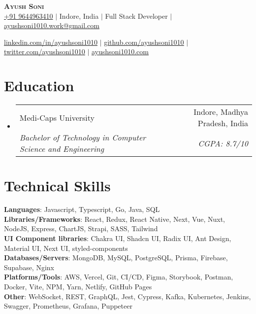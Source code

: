 \documentclass[letterpaper,11pt]{article}
\makeatletter
\newcommand{\resumeSubheading}[4]{
    \item
      \begin{tabular*}{0.97\textwidth}[t]{l@{\extracolsep{\fill}}r}
        {#1} & #2 \\
        \textit{\small#3} & \textit{\small #4} \\
      \end{tabular*}\vspace{-5pt}
  }
\newcommand{\resumeSubHeadingListStart}{\begin{itemize}[leftmargin=0.15in, label={}]}
\newcommand{\resumeSubHeadingListEnd}{\end{itemize}}
\makeatother
\begin{document}

\begin{center}
  \textbf{\Huge \scshape Ayush Soni} \\ \vspace{10pt}
  \href{tel:9644963410}{+91 9644963410} $|$
  {Indore, India} $|$
  {Full Stack Developer} $|$
  \href{mailto:ayushsoni1010.work@gmail.com}{ayushsoni1010.work@gmail.com} \\ \vspace{3pt}

  \href{https://linkedin.com/in/ayushsoni1010}{\underline{linkedin.com/in/ayushsoni1010}} $|$
  \href{https://github.com/ayushsoni1010}{\underline{github.com/ayushsoni1010}} $|$
  \href{https://twitter.com/ayushsoni1010}{\underline{twitter.com/ayushsoni1010}} $|$
  \href{https://ayushsoni1010.com}{\underline{ayushsoni1010.com}}
\end{center}



\section{Education}
\resumeSubHeadingListStart
\resumeSubheading
{Medi-Caps University}{Indore, Madhya Pradesh, India}
{Bachelor of Technology in Computer Science and Engineering}{CGPA: 8.7/10}
\resumeSubHeadingListEnd



\section{Technical Skills}
\begin{itemize}[leftmargin=0.15in, label={}]
  \small{\item{
        \textbf{Languages}{: \hfill Javascript, Typescript, Go, Java, SQL } \\
        \vspace{3pt}\textbf{Libraries/Frameworks}{: \hfill React, Redux, React Native, Next, Vue, Nuxt, NodeJS, Express, ChartJS, Strapi, SASS, Tailwind} \\
        \vspace{3pt}\textbf{UI Component libraries}{: \hfill Chakra UI, Shadcn UI, Radix UI, Ant Design, Material UI, Next UI, styled-components} \\
        \vspace{3pt}\textbf{Databases/Servers}{: \hfill MongoDB, MySQL, PostgreSQL, Prisma, Firebase, Supabase, Nginx} \\
        \vspace{3pt}\textbf{Platforms/Tools}{: \hfill AWS, Vercel, Git, CI/CD, Figma, Storybook, Postman, Docker, Vite, NPM, Yarn, Netlify, GitHub Pages } \\
        \vspace{3pt}\textbf{Other}{: \hfill WebSocket, REST, GraphQL, Jest, Cypress, Kafka, Kubernetes, Jenkins,  Swagger, Prometheus, Grafana, Puppeteer }
        }}
\end{itemize}
\end{document}

